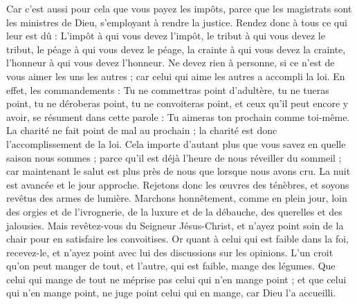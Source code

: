 \begin{multicols}{2}
Car c'est aussi pour cela que vous payez les impôts, parce que les magistrats sont les ministres de Dieu, s'employant à rendre la justice.
Rendez donc à tous ce qui leur est dû : L’impôt à qui vous devez l’impôt, le tribut à qui vous devez le tribut, le péage à qui vous devez le péage, la crainte à qui vous devez la crainte, l’honneur à qui vous devez l'honneur.
Ne devez rien à personne, si ce n’est de vous aimer les uns les autres ; car celui qui aime les autres a accompli la loi.
En effet, les commandements : Tu ne commettras point d’adultère, tu ne tueras point, tu ne déroberas point, tu ne convoiteras point, et ceux qu’il peut encore y avoir, se résument dans cette parole : Tu aimeras ton prochain comme toi-même.
La charité ne fait point de mal au prochain ; la charité est donc l'accomplissement de la loi.
Cela importe d’autant plus que vous savez en quelle saison nous sommes ; parce qu'il est déjà l’heure de nous réveiller du sommeil ; car maintenant le salut est plus près de nous que lorsque nous avons cru.
La nuit est avancée et le jour approche. Rejetons donc les œuvres des ténèbres, et soyons revêtus des armes de lumière.
Marchons honnêtement, comme en plein jour, loin des orgies et de l’ivrognerie, de la luxure et de la débauche, des querelles et des jalousies.
Mais revêtez-vous du Seigneur Jésus-Christ, et n'ayez point soin de la chair pour en satisfaire les convoitises.
\VerseOne{}Or quant à celui qui est faible dans la foi, recevez-le, et n'ayez point avec lui des discussions sur les opinions.
L'un croit qu'on peut manger de tout, et l'autre, qui est faible, mange des légumes.
Que celui qui mange de tout ne méprise pas celui qui n'en mange point ; et que celui qui n'en mange point, ne juge point celui qui en mange, car Dieu l'a accueilli.

\end{multicols}
